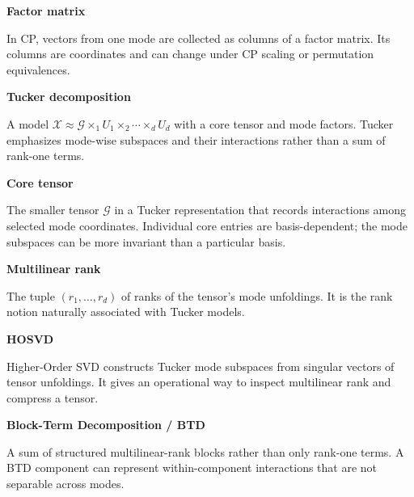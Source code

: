\documentclass[10pt]{article}
\newenvironment{glossaryentry}[1]{%
  \par\medskip\noindent
  {\large\bfseries #1}\par\smallskip
}{\par\medskip}
\begin{document}
\begin{glossaryentry}{Factor matrix}
In CP, vectors from one mode are collected as columns of a factor matrix. Its columns are coordinates and can change under CP scaling or permutation equivalences.
\par\smallskip{\small\color{muted}[KB09]}
\end{glossaryentry}


\begin{glossaryentry}{Tucker decomposition}
A model $\mathcal X\approx\mathcal G\times_1U_1\times_2\cdots\times_dU_d$ with a core tensor and mode factors. Tucker emphasizes mode-wise subspaces and their interactions rather than a sum of rank-one terms.
\par\smallskip{\small\color{muted}[KB09, DLV00]}
\end{glossaryentry}


\begin{glossaryentry}{Core tensor}
The smaller tensor $\mathcal G$ in a Tucker representation that records interactions among selected mode coordinates. Individual core entries are basis-dependent; the mode subspaces can be more invariant than a particular basis.
\par\smallskip{\small\color{muted}[KB09]}
\end{glossaryentry}


\begin{glossaryentry}{Multilinear rank}
The tuple $(r_1,\ldots,r_d)$ of ranks of the tensor's mode unfoldings. It is the rank notion naturally associated with Tucker models.
\par\smallskip{\small\color{muted}[DLV00]}
\end{glossaryentry}


\begin{glossaryentry}{HOSVD}
Higher-Order SVD constructs Tucker mode subspaces from singular vectors of tensor unfoldings. It gives an operational way to inspect multilinear rank and compress a tensor.
\par\smallskip{\small\color{muted}[DLV00]}
\end{glossaryentry}


\begin{glossaryentry}{Block-Term Decomposition / BTD}
A sum of structured multilinear-rank blocks rather than only rank-one terms. A BTD component can represent within-component interactions that are not separable across modes.
\par\smallskip{\small\color{muted}[DL08]}
\end{glossaryentry}
\end{document}
